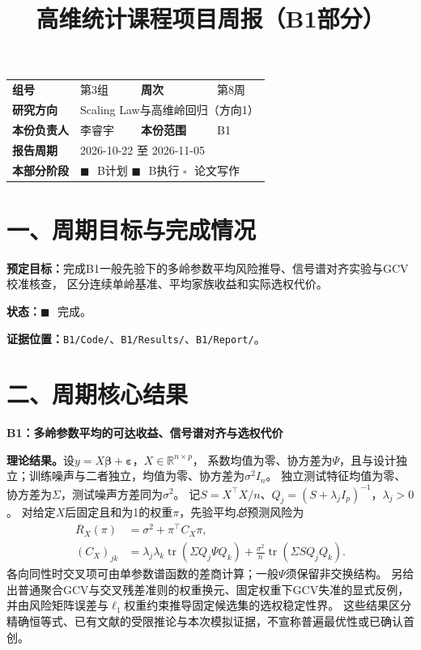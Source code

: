 \documentclass[UTF8,fontset=fandol,11pt,a4paper]{ctexart}
\title{\textbf{高维统计课程项目周报（B1部分）}}
\author{}
\date{}
\newcommand{\cbox}{\(\square\)\,}
\newcommand{\bbox}{\(\blacksquare\)\,}
\begin{document}
\maketitle
\vspace{-2.5em}
\begin{tabularx}{\textwidth}{@{}>{\bfseries}lX>{\bfseries}lX@{}}
组号 & 第3组 & 周次 & 第8周 \\
研究方向 & \multicolumn{3}{l}{Scaling Law与高维岭回归（方向1）} \\
本份负责人 & 李睿宇 & 本份范围 & B1 \\
报告周期 & \multicolumn{3}{l}{2026-10-22 至 2026-11-05} \\
本部分阶段 & \multicolumn{3}{l}{\bbox\ B计划 \quad \bbox\ B执行 \quad \cbox\ 论文写作} \\
\end{tabularx}

\section*{一、周期目标与完成情况}
\textbf{预定目标：}完成B1一般先验下的多岭参数平均风险推导、信号谱对齐实验与GCV校准核查，
区分连续单岭基准、平均家族收益和实际选权代价。\par
\textbf{状态：}\bbox\ 完成。\par
\textbf{证据位置：}\nolinkurl{B1/Code/}、\nolinkurl{B1/Results/}、\nolinkurl{B1/Report/}。

\section*{二、周期核心结果}
\textbf{B1：多岭参数平均的可达收益、信号谱对齐与选权代价}

\textbf{理论结果。}设$y=X\bm\beta+\bm\varepsilon$，$X\in\mathbb R^{n\times p}$，
系数均值为零、协方差为$\Psi$，且与设计独立；训练噪声与二者独立，均值为零、协方差为$\sigma^2I_n$。
独立测试特征均值为零、协方差为$\Sigma$，测试噪声方差同为$\sigma^2$。
记$S=X^\top X/n$、$Q_j=(S+\lambda_jI_p)^{-1}$，$\lambda_j>0$。
对给定$X$后固定且和为1的权重$\pi$，先验平均\emph{总}预测风险为
\begin{equation*}
\begin{aligned}
\overline R_X(\pi)&=\sigma^2+\pi^\top C_X\pi,\\
(C_X)_{jk}
&=\lambda_j\lambda_k\operatorname{tr}(\Sigma Q_j\Psi Q_k)
+\frac{\sigma^2}{n}\operatorname{tr}(\Sigma SQ_jQ_k).
\end{aligned}
\tag{B1-1}\label{eq:w8-b1-risk}
\end{equation*}
各向同性时交叉项可由单参数谱函数的差商计算；一般$\Psi$须保留非交换结构。
另给出普通聚合GCV与交叉残差准则的权重换元、固定权重下GCV失准的显式反例，
并由风险矩阵误差与$\ell_1$权重约束推导固定候选集的选权稳定性界。
这些结果区分精确恒等式、已有文献的受限推论与本次模拟证据，不宣称普遍最优性或已确认首创。
\end{document}
